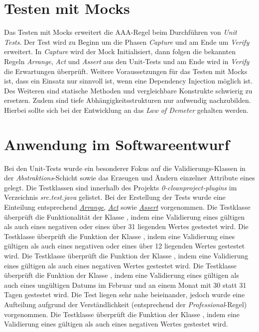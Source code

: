 \section{Testen mit Mocks}
Das Testen mit Mocks erweitert die AAA-Regel beim Durchführen von \textit{Unit Tests}.
Der Test wird zu Beginn um die Phasen \textit{Capture} und am Ende um \textit{Verify} erweitert.
In \textit{Capture} wird der Mock Initialisiert, dann folgen die bekannten Regeln \textit{Arrange}, \textit{Act} und \textit{Assert} aus den Unit-Tests und am Ende wird in \textit{Verify} die Erwartungen überprüft.
Weitere Voraussetzungen für das Testen mit Mocks ist, dass ein Einsatz nur sinnvoll ist, wenn eine Dependency Injection möglich ist.
Des Weiteren sind statische Methoden und vergleichbare Konstrukte schwierig zu ersetzen.
Zudem sind tiefe Abhängigkeitsstrukturen nur aufwendig nachzubilden.
Hierbei sollte sich bei der Entwicklung an das \textit{Law of Demeter} gehalten werden.

\section{Anwendung im Softwareentwurf}
Bei den Unit-Tests wurde ein besonderer Fokus auf die Validierungs-Klassen in der \textit{Abstraktions}-Schicht sowie das Erzeugen und Ändern einzelner Attribute eines \href{}{} gelegt.
Die Testklassen sind innerhalb des Projekts \textit{0-cleanproject-plugins} im Verzeichnis \textit{src.test.java} gelistet.
Bei der Erstellung der Tests wurde eine Einteilung entsprechend \href{}{\textit{Arrange}}, \href{}{\textit{Act}} sowie \href{}{\textit{Assert}} vorgenommen.
Die Testklasse \href{}{} überprüft die Funktionalität der Klasse \href{}{}, indem eine Validierung eines gültigen als auch eines negativen oder eines über 31 liegenden Wertes gestestet wird.
Die Testklasse \href{}{} überprüft die Funktion der Klasse \href{}{}, indem eine Validierung eines gültigen als auch eines negativen oder eines über 12 liegenden Wertes gestestet wird.
Die Testklasse \href{}{} überprüft die Funktion der Klasse \href{}{}, indem eine Validierung eines gültigen als auch eines negativen Wertes gestestet wird.
Die Testklasse \href{}{} überprüft die Funktion der Klasse , indem eine Validierung eines gültigen als auch eines ungültigen Datums im Februar und an einem Monat mit 30 statt 31 Tagen gestestet wird.
Die Test liegen sehr nahe beieinander, jedoch wurde eine Aufteilung aufgrund der Verständlichkeit (entsprechend der \textit{Professional}-Regel) vorgenommen.
Die Testklasse \href{}{} überprüft die Funktion der Klasse \href{}{}, indem eine Validierung eines gültigen als auch eines negativen Wertes gestestet wird.

